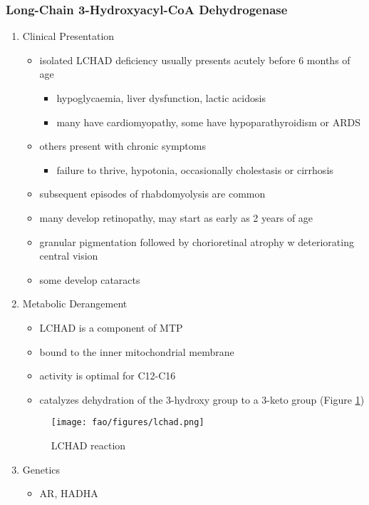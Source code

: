 \documentclass{scrartcl}
\begin{document}
\subsubsection{Long-Chain 3-Hydroxyacyl-CoA Dehydrogenase}
\label{sec:orgf2368cb}
\begin{enumerate}
\item Clinical Presentation
\label{sec:org51c9d1b}
\begin{itemize}
\item isolated LCHAD deficiency usually presents acutely before 6 months of age
\begin{itemize}
\item hypoglycaemia, liver dysfunction, lactic acidosis
\item many have cardiomyopathy, some have hypoparathyroidism or ARDS
\end{itemize}
\item others present with chronic symptoms
\begin{itemize}
\item failure to thrive, hypotonia, occasionally cholestasis or cirrhosis
\end{itemize}
\item subsequent episodes of rhabdomyolysis are common
\item many develop retinopathy, may start as early as 2 years of age
\item granular pigmentation followed by chorioretinal atrophy w deteriorating central vision
\item some develop cataracts
\end{itemize}
\item Metabolic Derangement
\label{sec:org80e361b}
\begin{itemize}
\item LCHAD is a component of MTP
\item bound to the inner mitochondrial membrane
\item activity is optimal for C12-C16
\item catalyzes dehydration of the 3-hydroxy group to a 3-keto group
(Figure \ref{fig:org4b55e58})
\end{itemize}
\begin{figure}[htbp]
\centering
\texttt{[image: fao/figures/lchad.png]}
\caption{\label{fig:org4b55e58}LCHAD reaction}
\end{figure}

\item Genetics
\label{sec:orgbf84807}
\begin{itemize}
\item AR, HADHA
\end{itemize}


\end{enumerate}
\end{document}
